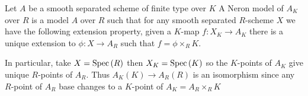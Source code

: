 \documentclass[12pt]{article}
\begin{document}
\begin{definition}
Let $A$ be a smooth separated scheme of finite type over $K$
A Neron model of $A_K$ over $R$ is a model $A$ over $R$ such that for any smooth separated $R$-scheme $X$ we have the following extension property, given a $K$-map $f : X_K \to A_K$ there is a unique extension to $\phi : X \to A_R$ such that $f = \phi \times_R K$.  
\begin{center}
\end{center}
In particular, take $X = \mathrm{Spec}\left( R \right)$ then $X_K = \mathrm{Spec}\left( K \right)$ so the $K$-points of $A_K$ give unique $R$-points of $A_R$. Thus $A_K(K) \to A_R(R)$ is an isomorphism since any $R$-point of $A_R$ base changes to a $K$-point of $A_K = A_R \times_R K$ 
\end{definition}
\end{document}
